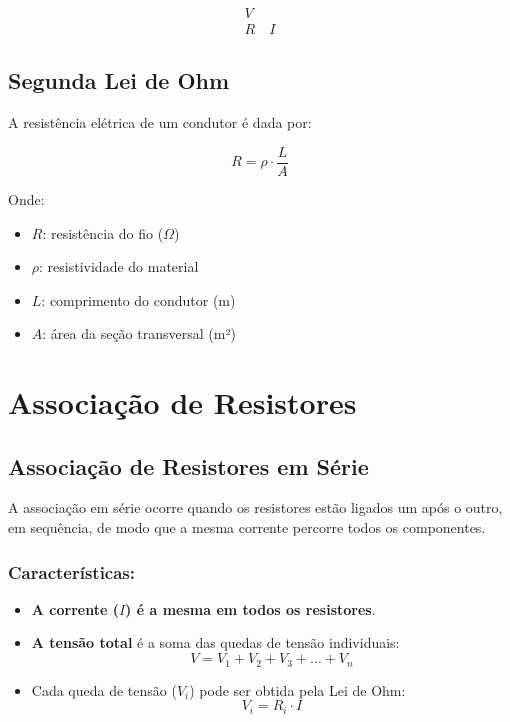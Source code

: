 \[
\begin{array}{c}
\boxed{V} \\
\boxed{R \quad I}
\end{array}
\]

\subsection*{Segunda Lei de Ohm}
A resistência elétrica de um condutor é dada por:

\[
R = \rho \cdot \frac{L}{A}
\]

Onde:
\begin{itemize}
    \item $R$: resistência do fio (\(\Omega\))
    \item $\rho$: resistividade do material
    \item $L$: comprimento do condutor (m)
    \item $A$: área da seção transversal (m²)
\end{itemize}

\section{Associação de Resistores}

\subsection{Associação de Resistores em Série}
A associação em série ocorre quando os resistores estão ligados um após o outro, em sequência, de modo que a mesma corrente percorre todos os componentes.


\subsubsection{Características:}
\begin{itemize}
    \item \textbf{A corrente ($I$) é a mesma em todos os resistores}.
    \item \textbf{A tensão total} é a soma das quedas de tensão individuais:
    \[
    V = V_1 + V_2 + V_3 + \dots + V_n
    \]
    \item Cada queda de tensão ($V_i$) pode ser obtida pela Lei de Ohm:
    \[
    V_i = R_i \cdot I
    \]
\end{itemize}


